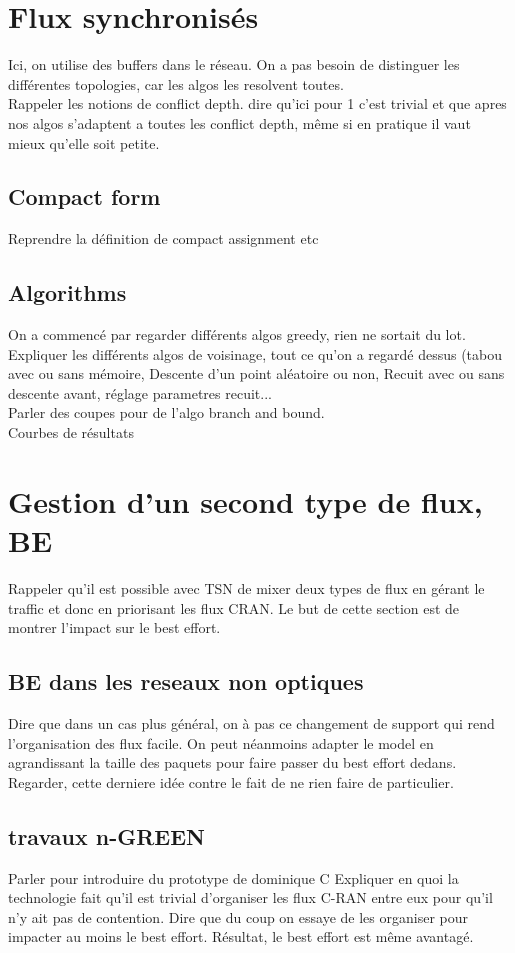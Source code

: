 \documentclass[a4paper,10pt]{article}
\begin{document}
\section{Flux synchronisés}
Ici, on utilise des buffers dans le réseau. On a pas besoin de distinguer les différentes topologies, car les algos les resolvent toutes. \\
Rappeler les notions de conflict depth. dire qu'ici pour 1 c'est trivial et que apres nos algos s'adaptent a toutes les conflict depth, même si en pratique il vaut mieux qu'elle soit petite.
\subsection{Compact form}
Reprendre la définition de compact assignment etc
\subsection{Algorithms}
On a commencé par regarder différents algos greedy, rien ne sortait du lot.
Expliquer les différents algos de voisinage, tout ce qu'on a regardé dessus (tabou avec ou sans mémoire, Descente d'un point aléatoire ou non, Recuit avec ou sans descente avant, réglage parametres recuit...\\
Parler des coupes pour de l'algo branch and bound.\\
Courbes de résultats

\section{Gestion d'un second type de flux, BE}
Rappeler qu'il est possible avec TSN de mixer deux types de flux en gérant le traffic et donc en priorisant les flux CRAN. Le but de cette section est de montrer l'impact sur le best effort.

\subsection{BE dans les reseaux non optiques}
Dire que dans un cas plus général, on à pas ce changement de support qui rend l'organisation des flux facile. On peut néanmoins adapter le model en agrandissant la taille des paquets pour faire passer du best effort dedans. Regarder, cette derniere idée contre le fait de ne rien faire de particulier.
\subsection{travaux n-GREEN}
Parler pour introduire du prototype de dominique C
Expliquer en quoi la technologie fait qu'il est trivial d'organiser les flux C-RAN entre eux pour qu'il n'y ait pas de contention. 
Dire que du coup on essaye de les organiser pour impacter au moins le best effort. Résultat, le best effort est même avantagé.
\end{document}
